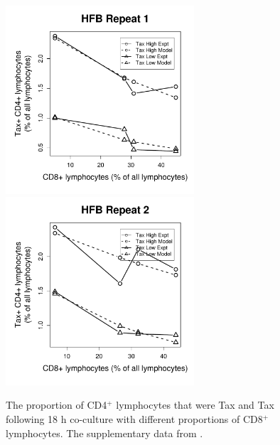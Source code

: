 \begin{figure}[htp]
\includegraphics[width=7cm]{./Figures/chapter5/figure_lysis_hfb_rep_1}%
\hspace{0cm}%
\includegraphics[width=7cm]{./Figures/chapter5/figure_lysis_hfb_rep_2} \\
\caption[CD8$^+$ antiviral efficacy assay: other patients]{The proportion of CD4$^+$ lymphocytes that were Tax and Tax following 18 h co-culture with different proportions of CD8$^+$ lymphocytes. The supplementary data from .}
\label{appendixb/figureLysisHighLow}
\end{figure}

